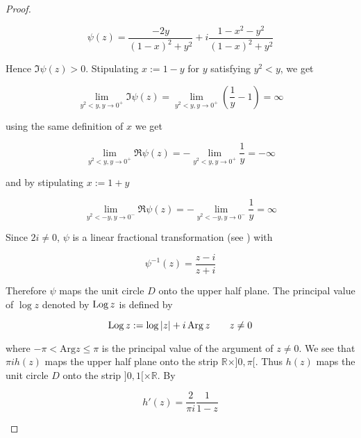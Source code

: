 \begin{proof}
\begin{enumerate}[label = \textbf{(\roman*)}]
\begin{enumerate}[label = \textbf{\alph*.}]
	\begin{equation}
		\psi(z) = \frac{-2y}{(1 - x)^2 + y^2} + i \frac{1 - x^2 - y^2}{(1 - x)^2 + y^2}
		\label{eq:rep_lft}
	\end{equation}

	Hence $\Im \psi(z) > 0$. Stipulating $x := 1 - y$ for $y$ satisfying $y^2 < y$, we get

	\begin{equation}
		\lim\limits_{y^2 < y, y \rightarrow 0^+} \Im \psi(z) = \lim\limits_{y^2 < y, y \rightarrow 0^+} \left( \frac{1}{y} - 1 \right) = \infty
	\end{equation}

	using the same definition of $x$ we get

	\begin{equation}
		\lim\limits_{y^2 < y, y \rightarrow 0^+} \Re \psi(z) = -\lim\limits_{y^2 < y, y \rightarrow 0^+} \frac{1}{y} = -\infty
	\end{equation}

	and by stipulating $x := 1 + y$

	\begin{equation}
		\lim\limits_{y^2 < -y, y \rightarrow 0^-} \Re \psi(z) = -\lim\limits_{y^2 < -y, y \rightarrow 0^-} \frac{1}{y} = \infty	
	\end{equation}


	Since $2i \neq 0$, $\psi$ is a linear fractional transformation (see \cite[279]{rudin:rc_analysis:1987}) with

	\begin{equation}
		\psi^{-1}(z) = \frac{z - i}{z + i}
	\end{equation}

	Therefore $\psi$ maps the unit circle $D$ onto the upper half plane. The principal value of $\log z$ denoted by $\operatorname{Log} z$ is defined by 

	\begin{equation}
		\operatorname{Log} z := \log \vert z \vert + i \operatorname{Arg} z \qquad z \neq 0
	\end{equation}

where $-\pi < \mathrm{Arg} z \leqslant \pi$ is the principal value of the argument of $z \neq 0$.  We see that $\pi i h(z)$ maps the upper half plane onto the strip $\mathbb{R} \times ]0,\pi[$. Thus $h(z)$ maps the unit circle $D$ onto the strip $]0,1[ \times \mathbb{R}$. By

\begin{equation}
	h'(z) = \frac{2}{\pi i} \frac{1}{1 - z}
	\label{eq:h_diff}
\end{equation}


\end{enumerate}
\end{enumerate}
\end{proof}
